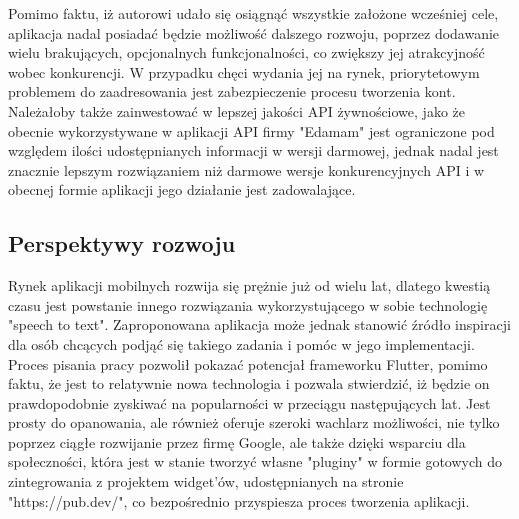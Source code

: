 \documentclass[12pt, a4paper]{article}
\begin{document}
\begin{sloppypar}
{  Pomimo faktu, iż autorowi udało się osiągnąć wszystkie założone wcześniej cele, aplikacja nadal
  posiadać będzie możliwość dalszego rozwoju, poprzez dodawanie wielu brakujących, opcjonalnych
  funkcjonalności, co zwiększy jej atrakcyjność wobec konkurencji. 
  W przypadku chęci wydania jej na rynek, priorytetowym problemem do zaadresowania jest zabezpieczenie
  procesu tworzenia kont. Należałoby także zainwestować w lepszej jakości API żywnościowe, jako że
  obecnie wykorzystywane w aplikacji API firmy "Edamam" jest ograniczone pod względem ilości
  udostępnianych informacji w wersji darmowej, jednak nadal jest znacznie lepszym rozwiązaniem niż
  darmowe wersje konkurencyjnych API i w obecnej formie aplikacji jego działanie jest
  zadowalające.

  \subsection{Perspektywy rozwoju}
  {
  Rynek aplikacji mobilnych rozwija się prężnie już od wielu lat, dlatego kwestią czasu
  jest powstanie innego rozwiązania wykorzystującego w sobie technologię "speech to text".
  Zaproponowana aplikacja może jednak stanowić źródło inspiracji dla osób chcących podjąć
  się takiego zadania i pomóc w jego implementacji. Proces pisania pracy pozwolił pokazać
  potencjał frameworku Flutter, pomimo faktu, że jest to relatywnie nowa technologia i
  pozwala stwierdzić, iż będzie on prawdopodobnie zyskiwać na popularności w przeciągu
  następujących lat. Jest prosty do opanowania, ale również oferuje szeroki wachlarz
  możliwości, nie tylko poprzez ciągłe rozwijanie przez firmę Google, ale także dzięki
  wsparciu dla społeczności, która jest w stanie tworzyć własne "pluginy" w formie
  gotowych do zintegrowania z projektem widget'ów, udostępnianych na stronie
  "https://pub.dev/", co bezpośrednio przyspiesza proces tworzenia aplikacji.
  }
}
\listoffigures

\printbibliography[
heading=bibintoc,
title={Bibliografia}
]


\end{sloppypar}
\end{document}
